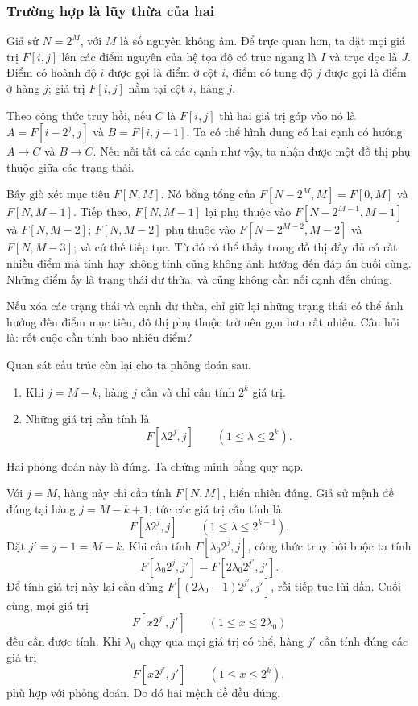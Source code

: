 \documentclass[11pt]{article}
\begin{document}
\subsubsection{Trường hợp là lũy thừa của hai}

Giả sử $N=2^M$, với $M$ là số nguyên không âm. Để trực quan hơn, ta đặt mọi
giá trị $F[i,j]$ lên các điểm nguyên của hệ tọa độ có trục ngang là $I$ và
trục dọc là $J$. Điểm có hoành độ $i$ được gọi là điểm ở cột $i$, điểm có tung
độ $j$ được gọi là điểm ở hàng $j$; giá trị $F[i,j]$ nằm tại cột $i$, hàng
$j$.

Theo công thức truy hồi, nếu $C$ là $F[i,j]$ thì hai giá trị góp vào nó là
$A=F[i-2^j,j]$ và $B=F[i,j-1]$. Ta có thể hình dung có hai cạnh có hướng
$A\to C$ và $B\to C$. Nếu nối tất cả các cạnh như vậy, ta nhận được một đồ
thị phụ thuộc giữa các trạng thái.

Bây giờ xét mục tiêu $F[N,M]$. Nó bằng tổng của $F[N-2^M,M]=F[0,M]$ và
$F[N,M-1]$. Tiếp theo, $F[N,M-1]$ lại phụ thuộc vào
$F[N-2^{M-1},M-1]$ và $F[N,M-2]$; $F[N,M-2]$ phụ thuộc vào
$F[N-2^{M-2},M-2]$ và $F[N,M-3]$; và cứ thế tiếp tục. Từ đó có thể thấy trong
đồ thị đầy đủ có rất nhiều điểm mà tính hay không tính cũng không ảnh hưởng
đến đáp án cuối cùng. Những điểm ấy là trạng thái dư thừa, và cũng không cần
nối cạnh đến chúng.

Nếu xóa các trạng thái và cạnh dư thừa, chỉ giữ lại những trạng thái có thể
ảnh hưởng đến điểm mục tiêu, đồ thị phụ thuộc trở nên gọn hơn rất nhiều. Câu
hỏi là: rốt cuộc cần tính bao nhiêu điểm?

Quan sát cấu trúc còn lại cho ta phỏng đoán sau.
\begin{enumerate}
  \item Khi $j=M-k$, hàng $j$ cần và chỉ cần tính $2^k$ giá trị.
  \item Những giá trị cần tính là
  \[
    F[\lambda 2^j,j]\qquad (1\le \lambda\le 2^k).
  \]
\end{enumerate}

Hai phỏng đoán này là đúng. Ta chứng minh bằng quy nạp.

Với $j=M$, hàng này chỉ cần tính $F[N,M]$, hiển nhiên đúng. Giả sử mệnh đề
đúng tại hàng $j=M-k+1$, tức các giá trị cần tính là
\[
  F[\lambda 2^j,j]\qquad (1\le \lambda\le 2^{k-1}).
\]
Đặt $j'=j-1=M-k$. Khi cần tính $F[\lambda_0 2^j,j]$, công thức truy hồi buộc
ta tính
\[
  F[\lambda_0 2^j,j']
  =F[2\lambda_0 2^{j'},j'].
\]
Để tính giá trị này lại cần dùng
$F[(2\lambda_0-1)2^{j'},j']$, rồi tiếp tục lùi dần. Cuối cùng, mọi giá trị
\[
  F[x2^{j'},j']\qquad (1\le x\le 2\lambda_0)
\]
đều cần được tính. Khi $\lambda_0$ chạy qua mọi giá trị có thể, hàng $j'$ cần
tính đúng các giá trị
\[
  F[x2^{j'},j']\qquad (1\le x\le 2^k),
\]
phù hợp với phỏng đoán. Do đó hai mệnh đề đều đúng.
\end{document}
